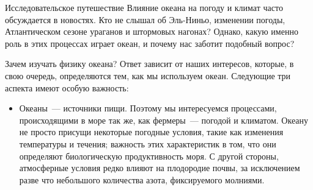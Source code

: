 
\begin{chapter}{Исследовательское путешествие}
Влияние океана на погоду и климат часто обсуждается в новостях. Кто не слышал 
об Эль-Ниньо, изменении погоды, Атлантическом сезоне ураганов и штормовых 
нагонах? Однако, какую именно роль в этих процессах играет океан, и почему 
нас заботит подобный вопрос?
%

\begin{section}{Зачем изучать физику океана?}
Ответ зависит от наших интересов, которые, в свою очередь, определяются тем,
как мы используем океан. Следующие три аспекта имеют особую важность:
%

\begin{itemize}
\item 
Океаны~--- источники пищи. Поэтому мы интересуемся процессами, происходящими 
в море так же, как фермеры~--- погодой и климатом. Океану не просто присущи 
некоторые погодные условия, такие как изменения температуры и течения; 
важность этих характеристик в том, что они определяют биологическую 
продуктивность моря. С другой стороны, атмосферные условия редко влияют 
на плодородие почвы, за исключением разве что небольшого количества азота, 
фиксируемого молниями.
%


\end{itemize}
\end{section}
\end{chapter}
